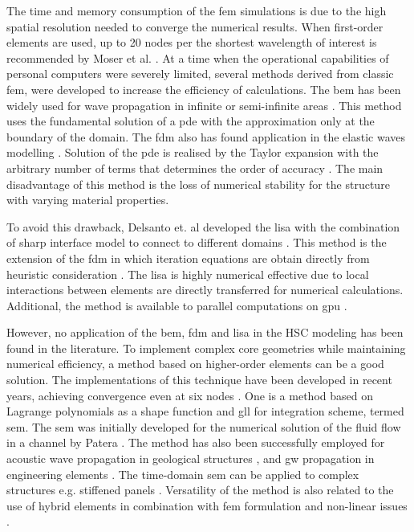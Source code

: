 The time and memory consumption of the \ac{fem} simulations is due to the high spatial resolution needed to converge the numerical results.
When first-order elements are used, up to 20 nodes per the shortest wavelength of interest is recommended by Moser et al. \cite{moser1999modeling}.
At a time when the operational capabilities of personal computers were severely limited, several methods derived from classic \ac{fem}, were developed to increase the efficiency of calculations. 
The \ac{bem} has been widely used for wave propagation in infinite or semi-infinite areas \cite{brebbia1984boundary}.
This method uses the fundamental solution of a \ac{pde} with the approximation only at the boundary of the domain.
The \ac{fdm} also has found application in the elastic waves modelling \cite{delsantoO1992connection}. 
Solution of the \ac{pde} is realised by the Taylor expansion with the arbitrary number of terms that determines the order of accuracy \cite{willberg2015simulation}.
The main disadvantage of this method is the loss of numerical stability for the structure with varying material properties.

To avoid this drawback, Delsanto et. al developed the \ac{lisa} with the combination of sharp interface model to connect to different domains \cite{delsantoO1992connection}. This method is the extension of the \ac{fdm} in which iteration equations are obtain directly from heuristic consideration \cite{willberg2015simulation}.
The \ac{lisa} is highly numerical effective due to local interactions between elements are directly transferred for numerical calculations.
Additional, the method is available to parallel computations on \ac{gpu} \cite{packo2012lamb}.

However, no application of the \ac{bem}, \ac{fdm} and \ac{lisa} in the HSC modeling has been found in the literature.
To implement complex core geometries while maintaining numerical efficiency, a method based on higher-order elements can be a good solution.
The implementations of this technique have been developed in recent years, achieving convergence even at six nodes \cite{willberg2012comparison}.
One is a method based on Lagrange polynomials as a shape function and \ac{gll} for integration scheme, termed \ac{sem}.
The \ac{sem} was initially developed for the numerical solution of the fluid flow in a channel by Patera \cite{patera1984spectral}.
The method has also been successfully employed for acoustic wave propagation in geological structures \cite{seriani1994spectral, komatitsch2000simulation},  and \ac{gw} propagation in engineering elements \cite{kudela2007wave, ostachowicz2011guided, rucka2010experimental,rekatsinas2017cubic}.
The time-domain \ac{sem} can be applied to complex structures e.g. stiffened panels \cite{schulte2011simulation, lonkar2014modeling}.
Versatility of the method is also related to the use of hybrid elements in combination with \ac{fem} formulation \cite{ha2009optimizing} and non-linear issues \cite{yu2020time, li2021hybrid}.

